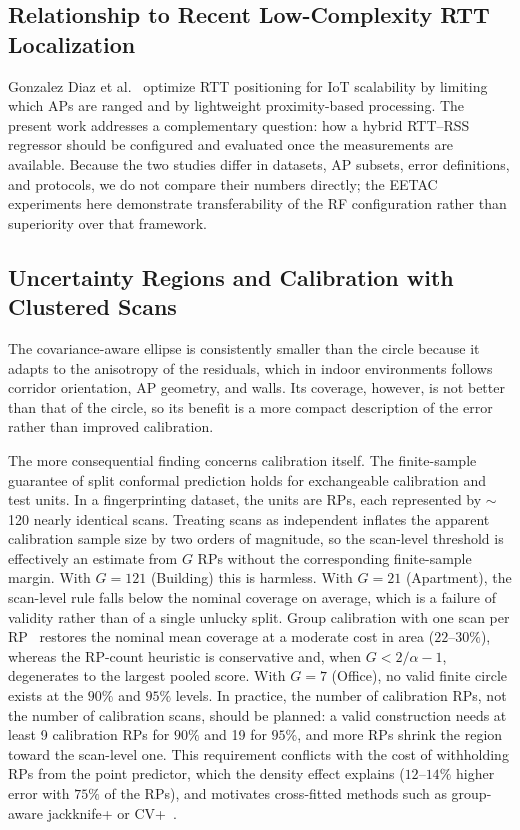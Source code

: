 \subsection{Relationship to Recent Low-Complexity RTT Localization}
\label{subsec:discussion_recent_methods}

Gonzalez Diaz et al.~\cite{gonzalezdiaz2026scalable} optimize RTT positioning for IoT scalability by limiting which APs are ranged and by lightweight proximity-based processing. The present work addresses a complementary question: how a hybrid RTT--RSS regressor should be configured and evaluated once the measurements are available. Because the two studies differ in datasets, AP subsets, error definitions, and protocols, we do not compare their numbers directly; the EETAC experiments here demonstrate transferability of the RF configuration rather than superiority over that framework.

\subsection{Uncertainty Regions and Calibration with Clustered Scans}
\label{subsec:discussion_uncertainty}

The covariance-aware ellipse is consistently smaller than the circle because it adapts to the anisotropy of the residuals, which in indoor environments follows corridor orientation, AP geometry, and walls. Its coverage, however, is not better than that of the circle, so its benefit is a more compact description of the error rather than improved calibration.

The more consequential finding concerns calibration itself. The finite-sample guarantee of split conformal prediction holds for exchangeable calibration and test units. In a fingerprinting dataset, the units are RPs, each represented by $\sim$120 nearly identical scans. Treating scans as independent inflates the apparent calibration sample size by two orders of magnitude, so the scan-level threshold is effectively an estimate from $G$ RPs without the corresponding finite-sample margin. With $G=121$ (Building) this is harmless. With $G=21$ (Apartment), the scan-level rule falls below the nominal coverage on average, which is a failure of validity rather than of a single unlucky split. Group calibration with one scan per RP~\cite{Dunn02102023} restores the nominal mean coverage at a moderate cost in area ($22$--$30\%$), whereas the RP-count heuristic is conservative and, when $G<2/\alpha-1$, degenerates to the largest pooled score. With $G=7$ (Office), no valid finite circle exists at the $90\%$ and $95\%$ levels. In practice, the number of calibration RPs, not the number of calibration scans, should be planned: a valid construction needs at least 9 calibration RPs for $90\%$ and 19 for $95\%$, and more RPs shrink the region toward the scan-level one. This requirement conflicts with the cost of withholding RPs from the point predictor, which the density effect explains ($12$--$14\%$ higher error with $75\%$ of the RPs), and motivates cross-fitted methods such as group-aware jackknife+ or CV+~\cite{barber2021jackknife,Dunn02102023}.

